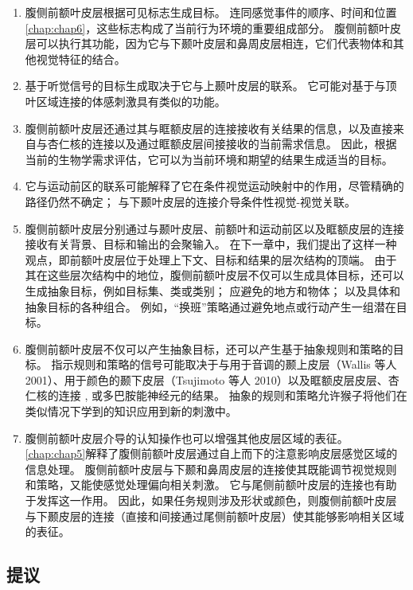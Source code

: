 \begin{enumerate}
\item 腹侧前额叶皮层根据可见标志生成目标。 
连同感觉事件的顺序、时间和位置\ref{chap:chap6}，这些标志构成了当前行为环境的重要组成部分。 
腹侧前额叶皮层可以执行其功能，因为它与下颞叶皮层和鼻周皮层相连，它们代表物体和其他视觉特征的结合。
\item 基于听觉信号的目标生成取决于它与上颞叶皮层的联系。 
它可能对基于与顶叶区域连接的体感刺激具有类似的功能。
\item 腹侧前额叶皮层还通过其与眶额皮层的连接接收有关结果的信息，以及直接来自与杏仁核的连接以及通过眶额皮层间接接收的当前需求信息。 
因此，根据当前的生物学需求评估，它可以为当前环境和期望的结果生成适当的目标。
\item 它与运动前区的联系可能解释了它在条件视觉运动映射中的作用，尽管精确的路径仍然不确定； 与下颞叶皮层的连接介导条件性视觉-视觉关联。
\item 腹侧前额叶皮层分别通过与颞叶皮层、前额叶和运动前区以及眶额皮层的连接接收有关背景、目标和输出的会聚输入。 
在下一章中，我们提出了这样一种观点，即前额叶皮层位于处理上下文、目标和结果的层次结构的顶端。 
由于其在这些层次结构中的地位，腹侧前额叶皮层不仅可以生成具体目标，还可以生成抽象目标，例如目标集、类或类别； 应避免的地方和物体； 以及具体和抽象目标的各种组合。 
例如，“换班”策略通过避免地点或行动产生一组潜在目标。
\item 腹侧前额叶皮层不仅可以产生抽象目标，还可以产生基于抽象规则和策略的目标。 
指示规则和策略的信号可能取决于与用于音调的颞上皮层（Wallis 等人 2001）、用于颜色的颞下皮层（Tsujimoto 等人 2010）以及眶额皮层皮层、杏仁核的连接 , 或多巴胺能神经元的结果。 
抽象的规则和策略允许猴子将他们在类似情况下学到的知识应用到新的刺激中。
\item 腹侧前额叶皮层介导的认知操作也可以增强其他皮层区域的表征。 
\ref{chap:chap5}解释了腹侧前额叶皮层通过自上而下的注意影响皮层感觉区域的信息处理。 
腹侧前额叶皮层与下颞和鼻周皮层的连接使其既能调节视觉规则和策略，又能使感觉处理偏向相关刺激。 
它与尾侧前额叶皮层的连接也有助于发挥这一作用。 
因此，如果任务规则涉及形状或颜色，则腹侧前额叶皮层与下颞皮层的连接（直接和间接通过尾侧前额叶皮层）使其能够影响相关区域的表征。
\end{enumerate}




\subsection{提议}
\par

